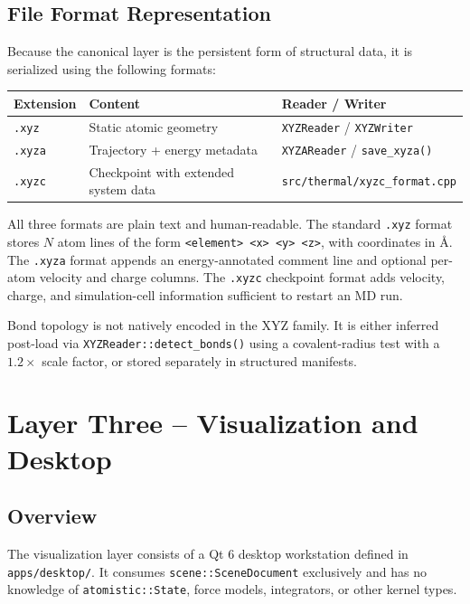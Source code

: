 ﻿\documentclass[11pt]{article}
\newcommand{\file}[1]{\texttt{#1}}
\newcommand{\type}[1]{\texttt{#1}}
\newcommand{\op}[1]{\texttt{#1}}
\begin{document}
\subsection{File Format Representation}

Because the canonical layer is the persistent form of structural data, it is
serialized using the following formats:

\begin{center}
\begin{tabular}{lll}
\toprule
Extension & Content & Reader / Writer \\
\midrule
\texttt{.xyz}  & Static atomic geometry & \type{XYZReader} / \type{XYZWriter} \\
\texttt{.xyza} & Trajectory + energy metadata & \type{XYZAReader} / \op{save\_xyza()} \\
\texttt{.xyzc} & Checkpoint with extended system data & \file{src/thermal/xyzc\_format.cpp} \\
\bottomrule
\end{tabular}
\end{center}

All three formats are plain text and human-readable. The standard
\texttt{.xyz} format stores $N$ atom lines of the form
\texttt{<element> <x> <y> <z>}, with coordinates in \AA. The
\texttt{.xyza} format appends an energy-annotated comment line and optional
per-atom velocity and charge columns. The \texttt{.xyzc} checkpoint format
adds velocity, charge, and simulation-cell information sufficient to restart
an MD run.

Bond topology is not natively encoded in the XYZ family. It is either inferred
post-load via \op{XYZReader::detect\_bonds()} using a covalent-radius test
with a $1.2\times$ scale factor, or stored separately in structured manifests.
\section{Layer Three -- Visualization and Desktop}

\subsection{Overview}

The visualization layer consists of a Qt 6 desktop workstation defined in
\file{apps/desktop/}. It consumes \type{scene::SceneDocument} exclusively and
has no knowledge of \type{atomistic::State}, force models, integrators, or
other kernel types.
\end{document}
